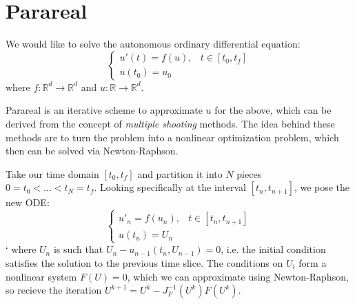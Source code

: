 \section{Parareal}

We would like to solve the autonomous ordinary differential equation:
\begin{equation*}
  \begin{cases}
    u'(t) = f(u), & t \in [t_0, t_f] \\
    u(t_0) = u_0
  \end{cases}
\end{equation*}
where $f : \mathbb{R}^d \to \mathbb{R}^d$ and $u: \mathbb{R} \to \mathbb{R}^d$.

Parareal is an iterative scheme to approximate $u$ for the above, which can be
derived from the concept of \textit{multiple shooting} methods. The idea behind
these methods are to turn the problem into a nonlinear optimization problem,
which then can be solved via Newton-Raphson. \cite{gandervandewalle}

Take our time domain $[t_0, t_f]$ and partition it into $N$ pieces $0 = t_0 <
\dots < t_N = t_f$. Looking specifically at the interval $[t_n, t_{n+1}]$, we
pose the new ODE:
\[
  \begin{cases}
    u'_n = f(u_n), & t \in [t_n, t_{n+1}] \\
    u(t_n) = U_n
  \end{cases}
\]`
where $U_n$ is such that $U_n - u_{n-1}(t_n, U_{n-1}) = 0$, i.e. the initial
condition satisfies the solution to the previous time slice. The conditions on
$U_i$ form a nonlinear system $F(U) = 0$, which we can approximate using
Newton-Raphson, so recieve the iteration $U^{k+1} = U^k - J_F^{-1}(U^k)F(U^k)$.
